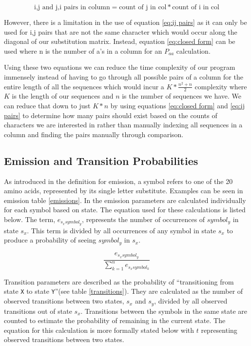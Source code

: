 \documentclass[a4paper,11pt]{article}
\begin{document}
\begin{equation}
	\label{eq:ij pairs}
	{\text{i,j and j,i pairs in column}} = \text{count of j in col} * \text{count of i in col}
\end{equation}

However, there is a limitation in the use of equation \ref{eq:ij pairs} as it can only be used for i,j pairs that are not the same character which would occur along the diagonal of our substitution matrix. Instead, equation \ref{eq:closed form} can be used where n is the number of a's in a column for an ${P_{aa}}$ calculation.

Using these two equations we can reduce the time complexity of our program immensely instead of having to go through all possible pairs of a column for the entire length of all the sequences which would incur a $K * \frac{n^{2} + n}{2}$ complexity where $K$ is the length of our sequences and $n$ is the number of sequences we have. We can reduce that down to just  $K * n$ by using equations \ref{eq:closed form} and \ref{eq:ij pairs} to determine how many pairs should exist based on the counts of characters we are interested in rather than manually indexing all sequences in a column and finding the pairs manually through comparison.






\subsection{Emission and Transition Probabilities}

As introduced in the definition for emission, a symbol refers to one of the 20 amino acids, represented by its single letter substitute. Examples can be seen in emission table \ref{emissions}. In the emission parameters are calculated individually for each symbol based on state. The equation used for these calculations is listed below. The term, $e_{s_{x}symbol_y}$, represents the number of occurrences of $symbol_y$ in state $s_x$. This term is divided by all occurrences of any symbol in state $s_x$ to produce a probability of seeing $symbol_y$ in $s_x$.

\begin{equation}
    \frac{e_{s_{x}symbol_y}}{\sum_{k=1}^n e_{s_xsymbol_k}}
\end{equation}


Transition parameters are described as the probability of ``transitioning from state \verb+X+ to state \verb+Y+''(see table \ref{transitions}). They are calculated as the number of observed transitions between two states, $s_x$ and $s_y$, divided by all observed transitions out of state $s_x$. Transitions between the symbols in the same state are counted to estimate the probability of remaining in the current state. The equation for this calculation is more formally stated below with $t$ representing observed transitions between two states.
\end{document}
